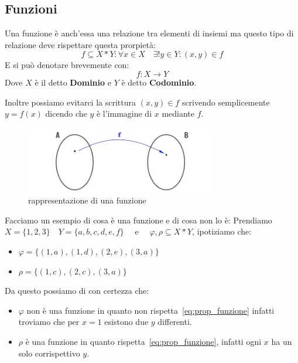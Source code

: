 \documentclass{article}
\begin{document}
\subsection{Funzioni}
Una funzione è anch'essa una relazione tra elementi di insiemi ma questo tipo di relazione deve rispettare questa prorpietà:
\begin{equation}\label{eq:prop_funzione}
        f \subseteq X*Y : \forall x \in X \quad \exists! y \in Y : (x,y) \in f 
\end{equation}
E si può denotare brevemente con:
\begin{equation*}
        f : X \to Y
\end{equation*}
Dove $ X $ è il detto \textbf{Dominio} e $ Y $ è detto \textbf{Codominio}. \par  
Inoltre possiamo evitarci la scrittura $ (x,y) \in f $ scrivendo semplicemente $ y = f(x) $ dicendo che $ y $ è l'immagine di $ x $ mediante $ f $. \par   

\begin{figure}[h]
        \centering
                \includegraphics[width=0.75\textwidth]{esempio_funzione.jpg}
        \caption{rappresentazione di una funzione}\label{fig:esempio_funzione}
\end{figure}
Facciamo un esempio di cosa è una funzione e di cosa non lo è: \newline
Prendiamo $ X = \{1,2,3\} \quad  Y = \{a,b,c,d,e,f\} \quad $  e $\quad  \varphi, \rho \subseteq X*Y$, ipotiziamo che:
\begin{itemize}
        \item $ \varphi = \{(1,a), (1,d), (2,e), (3,a)\} $ 
        \item $ \rho = \{(1,c), (2,c), (3,a)\} $ 
\end{itemize}

Da questo possiamo di con certezza che:
\begin{itemize}
        \item $ \varphi$ non è una funzione in quanto non rispetta~\ref{eq:prop_funzione} infatti troviamo che per $ x = 1 $ esistono due $ y $ differenti. 
        \item $ \rho $ è una funzione in quanto rispetta~\ref{eq:prop_funzione}, infatti ogni $ x $ ha un solo corrispettivo $ y $.     
\end{itemize}
\end{document}
